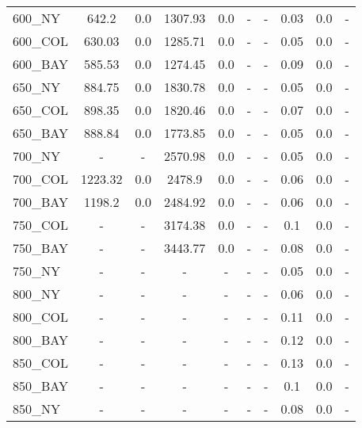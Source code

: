 \documentclass[main.tex]{subfiles}
\begin{document}
\begin{center}
\begin{tabular}{lccccccccc}
600\_NY & 642.2 & 0.0 & 1307.93 & 0.0 & - & - 
 & 0.03 & 0.0 & - \\
600\_COL & 630.03 & 0.0 & 1285.71 & 0.0 & - & - 
 & 0.05 & 0.0 & - \\
600\_BAY & 585.53 & 0.0 & 1274.45 & 0.0 & - & - 
 & 0.09 & 0.0 & - \\
650\_NY & 884.75 & 0.0 & 1830.78 & 0.0 & - & - 
 & 0.05 & 0.0 & - \\
650\_COL & 898.35 & 0.0 & 1820.46 & 0.0 & - & - 
 & 0.07 & 0.0 & - \\
650\_BAY & 888.84 & 0.0 & 1773.85 & 0.0 & - & - 
 & 0.05 & 0.0 & - \\
700\_NY & - & - 
 & 2570.98 & 0.0 & - & - 
 & 0.05 & 0.0 & - \\
700\_COL & 1223.32 & 0.0 & 2478.9 & 0.0 & - & - 
 & 0.06 & 0.0 & - \\
700\_BAY & 1198.2 & 0.0 & 2484.92 & 0.0 & - & - 
 & 0.06 & 0.0 & - \\
750\_COL & - & - 
 & 3174.38 & 0.0 & - & - 
 & 0.1 & 0.0 & - \\
750\_BAY & - & - 
 & 3443.77 & 0.0 & - & - 
 & 0.08 & 0.0 & - \\
750\_NY & - & - 
 & - & - 
 & - & - 
 & 0.05 & 0.0 & - \\
800\_NY & - & - 
 & - & - 
 & - & - 
 & 0.06 & 0.0 & - \\
800\_COL & - & - 
 & - & - 
 & - & - 
 & 0.11 & 0.0 & - \\
800\_BAY & - & - 
 & - & - 
 & - & - 
 & 0.12 & 0.0 & - \\
850\_COL & - & - 
 & - & - 
 & - & - 
 & 0.13 & 0.0 & - \\
850\_BAY & - & - 
 & - & - 
 & - & - 
 & 0.1 & 0.0 & - \\
850\_NY & - & - 
 & - & - 
 & - & - 
 & 0.08 & 0.0 & - \\
\hline\end{tabular}
\end{center}
\newpage
\end{document}

